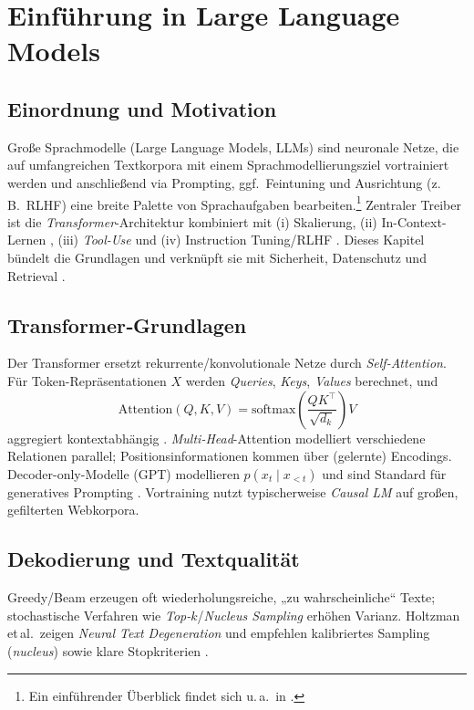 \section{Einführung in Large Language Models}
\label{sec:llm}

\subsection{Einordnung und Motivation}
Große Sprachmodelle (Large Language Models, LLMs) sind neuronale Netze, die auf umfangreichen Textkorpora mit einem Sprachmodellierungsziel vortrainiert werden und anschließend via Prompting, ggf.\ Feintuning und Ausrichtung (z.\,B.\ RLHF) eine breite Palette von Sprachaufgaben bearbeiten.\footnote{Ein einführender Überblick findet sich u.\,a.\ in \cite{campesatoLLMIntro}.} 
Zentraler Treiber ist die \emph{Transformer}-Architektur \cite{vaswani2017attention} kombiniert mit (i) Skalierung, (ii) In-Context-Lernen \cite{brown2020language,wei2022chain}, (iii) \emph{Tool-Use} \cite{yao2023react} und (iv) Instruction Tuning/RLHF \cite{ouyang2022training}. Dieses Kapitel bündelt die Grundlagen und verknüpft sie mit Sicherheit, Datenschutz und Retrieval \cite{abadi2016deep,carlini2021extracting,lewis2020rag}.

\subsection{Transformer‐Grundlagen}
Der Transformer ersetzt rekurrente/konvolutionale Netze durch \emph{Self-Attention}. Für Token-Repräsentationen $X$ werden \emph{Queries}, \emph{Keys}, \emph{Values} berechnet, und
\[
\mathrm{Attention}(Q,K,V)= \mathrm{softmax}\!\left(\frac{QK^\top}{\sqrt{d_k}}\right) V
\]
aggregiert kontextabhängig \cite{vaswani2017attention}. \emph{Multi-Head}-Attention modelliert verschiedene Relationen parallel; Positionsinformationen kommen über (gelernte) Encodings. Decoder-only-Modelle (GPT) modellieren $p(x_t\!\mid\!x_{<t})$ und sind Standard für generatives Prompting \cite{brown2020language}. Vortraining nutzt typischerweise \emph{Causal LM} auf großen, gefilterten Webkorpora.

\subsection{Dekodierung und Textqualität}
Greedy/Beam erzeugen oft wiederholungsreiche, „zu wahrscheinliche“ Texte; stochastische Verfahren wie \emph{Top-$k$}/\emph{Nucleus Sampling} erhöhen Varianz. Holtzman et\,al.\ zeigen \emph{Neural Text Degeneration} und empfehlen kalibriertes Sampling (\emph{nucleus}) sowie klare Stopkriterien \cite{holtzman2020curious}.

